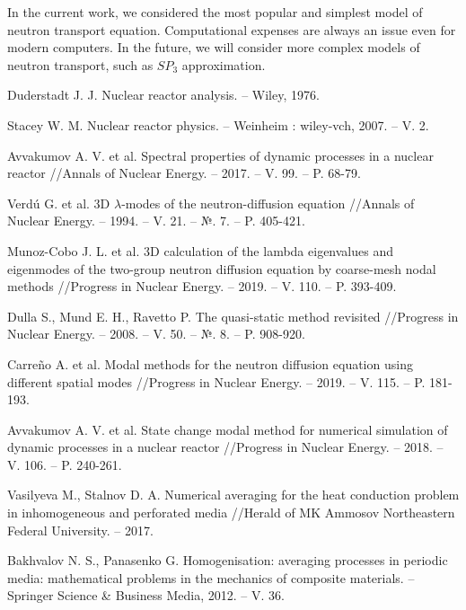 \documentclass[10pt]{article}
\begin{document}
In the current work, we considered the most popular and simplest model of neutron transport equation.
Computational expenses are always an issue even for modern computers.
In the future, we will consider more complex models of neutron transport, such as $SP_3$ approximation. 


\begin{thebibliography}{8}
Duderstadt J. J. Nuclear reactor analysis. – Wiley, 1976.

Stacey W. M. Nuclear reactor physics. – Weinheim : wiley-vch, 2007. – V. 2.

Avvakumov A. V. et al. Spectral properties of dynamic processes in a nuclear reactor //Annals of Nuclear Energy. – 2017. – V. 99. – P. 68-79.

Verdú G. et al. 3D $\lambda$-modes of the neutron-diffusion equation //Annals of Nuclear Energy. – 1994. – V. 21. – №. 7. – P. 405-421.

Munoz-Cobo J. L. et al. 3D calculation of the lambda eigenvalues and eigenmodes of the two-group neutron diffusion equation by coarse-mesh nodal methods //Progress in Nuclear Energy. – 2019. – V. 110. – P. 393-409.

Dulla S., Mund E. H., Ravetto P. The quasi-static method revisited //Progress in Nuclear Energy. – 2008. – V. 50. – №. 8. – P. 908-920.

Carreño A. et al. Modal methods for the neutron diffusion equation using different spatial modes //Progress in Nuclear Energy. – 2019. – V. 115. – P. 181-193.

Avvakumov A. V. et al. State change modal method for numerical simulation of dynamic processes in a nuclear reactor //Progress in Nuclear Energy. – 2018. – V. 106. – P. 240-261.

Vasilyeva M., Stalnov D. A. Numerical averaging for the heat conduction problem in inhomogeneous and perforated media //Herald of MK Ammosov Northeastern Federal University. – 2017.

Bakhvalov N. S., Panasenko G. Homogenisation: averaging processes in periodic media: mathematical problems in the mechanics of composite materials. – Springer Science \& Business Media, 2012. – V. 36.


\end{thebibliography}
\end{document}
